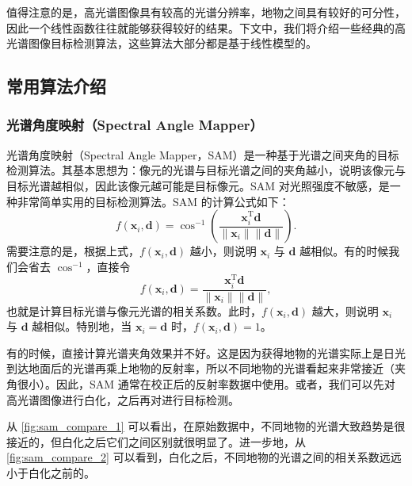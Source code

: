 值得注意的是，高光谱图像具有较高的光谱分辨率，地物之间具有较好的可分性，因此一个线性函数往往就能够获得较好的结果。下文中，我们将介绍一些经典的高光谱图像目标检测算法，这些算法大部分都是基于线性模型的。

\subsection{常用算法介绍}

\subsubsection{光谱角度映射（Spectral Angle Mapper）}
光谱角度映射（Spectral Angle Mapper，SAM）是一种基于光谱之间夹角的目标检测算法。其基本思想为：像元的光谱与目标光谱之间的夹角越小，说明该像元与目标光谱越相似，因此该像元越可能是目标像元。SAM 对光照强度不敏感，是一种非常简单实用的目标检测算法。SAM 的计算公式如下：
\[
    f(\mathbf{x}_{i}, \mathbf{d}) = \cos^{-1}\left(\frac{\mathbf{x}_{i}^{\mathrm{T}}\mathbf{d}}{\|\mathbf{x}_{i}\|\|\mathbf{d}\|}\right).
\]
需要注意的是，根据上式，\(f(\mathbf{x}_{i}, \mathbf{d})\) 越小，则说明 \(\mathbf{x}_{i}\) 与 \(\mathbf{d}\) 越相似。有的时候我们会省去 \(\cos^{-1}\)，直接令
\[
    f(\mathbf{x}_{i}, \mathbf{d}) = \frac{\mathbf{x}_{i}^{\mathrm{T}}\mathbf{d}}{\|\mathbf{x}_{i}\|\|\mathbf{d}\|},
\]
也就是计算目标光谱与像元光谱的相关系数。此时，\(f(\mathbf{x}_{i}, \mathbf{d})\) 越大，则说明 \(\mathbf{x}_{i}\) 与 \(\mathbf{d}\) 越相似。特别地，当 \(\mathbf{x}_{i} = \mathbf{d}\) 时，\(f(\mathbf{x}_{i}, \mathbf{d}) = 1\)。

有的时候，直接计算光谱夹角效果并不好。这是因为获得地物的光谱实际上是日光到达地面后的光谱再乘上地物的反射率，所以不同地物的光谱看起来非常接近（夹角很小）。因此，SAM 通常在校正后的反射率数据中使用。或者，我们可以先对高光谱图像进行白化，之后再对进行目标检测。

从 \cref{fig:sam_compare_1} 可以看出，在原始数据中，不同地物的光谱大致趋势是很接近的，但白化之后它们之间区别就很明显了。进一步地，从 \cref{fig:sam_compare_2} 可以看到，白化之后，不同地物的光谱之间的相关系数远远小于白化之前的。

